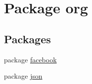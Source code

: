 \hypertarget{namespaceorg}{\section{Package org}
\label{namespaceorg}
}
\subsection*{Packages}
\begin{DoxyCompactItemize}
\item 
package \hyperlink{namespaceorg_1_1facebook}{facebook}
\item 
package \hyperlink{namespaceorg_1_1json}{json}
\end{DoxyCompactItemize}
